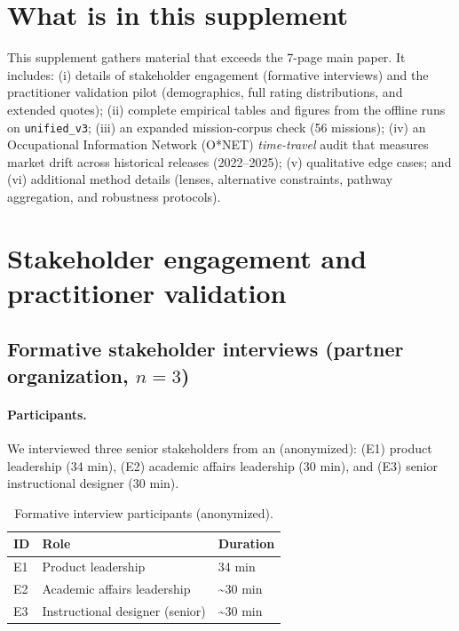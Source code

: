 \renewcommand{\thetable}{S\arabic{table}}
\renewcommand{\thefigure}{S\arabic{figure}}
\setcounter{table}{0}
\setcounter{figure}{0}


\section{What is in this supplement}
This supplement gathers material that exceeds the 7-page main paper. It includes:
(i) details of stakeholder engagement (formative interviews) and the practitioner validation pilot (demographics, full rating distributions, and extended quotes);
(ii) complete empirical tables and figures from the offline runs on \texttt{unified\_v3};
(iii) an expanded mission-corpus check (56 missions);
(iv) an Occupational Information Network (O*NET) \emph{time-travel} audit that measures market drift across historical releases (2022--2025);
(v) qualitative edge cases; and
(vi) additional method details (lenses, alternative constraints, pathway aggregation, and robustness protocols).


\section{Stakeholder engagement and practitioner validation}
\label{sec:supp-stakeholder}

\subsection{Formative stakeholder interviews (partner organization, $n{=}3$)}
\paragraph{Participants.} We interviewed three senior stakeholders from an \IndustryPartner (anonymized):
(E1) product leadership (34 min),
(E2) academic affairs leadership (30 min), and
(E3) senior instructional designer (30 min).

\begin{table}[h]
\centering
\small
\caption{Formative interview participants (anonymized).}
\label{tab:expert-participants}
\begin{tabular}{@{}lll@{}}
\toprule
ID & Role & Duration\\
\midrule
E1 & Product leadership & 34 min\\
E2 & Academic affairs leadership & \textasciitilde 30 min\\
E3 & Instructional designer (senior) & \textasciitilde 30 min\\
\bottomrule
\end{tabular}
\end{table}

